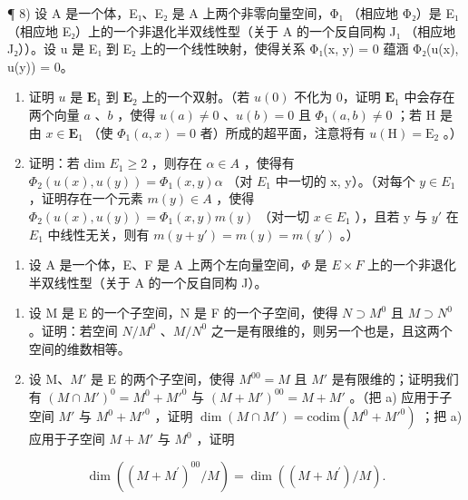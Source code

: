 ¶ 8) 设 A 是一个体，E₁、E₂ 是 A 上两个非零向量空间，Φ₁ （相应地 Φ₂）是 E₁ （相应地 E₂）上的一个非退化半双线性型（关于 A 的一个反自同构 J₁ （相应地 J₂））。设 u 是 E₁ 到 E₂ 上的一个线性映射，使得关系 Φ₁(x, y) = 0 蕴涵 Φ₂(u(x), u(y)) = 0。

\begin{enumerate}
\def\labelenumi{\alph{enumi})}
\item
  证明 \(u\) 是 \(\mathbf{E}_{1}\) 到 \(\mathbf{E}_{2}\) 上的一个双射。（若 \(u(0)\) 不化为 0，证明 \(\mathbf{E}_{1}\) 中会存在两个向量 \(a\) 、\(b\) ，使得 \(u(a) \neq 0\) 、\(u(b) = 0\) 且 \(\Phi_{1}(a, b) \neq 0\) ；若 H 是由 \(x \in \mathbf{E}_{1}\) （使 \(\Phi_{1}(a, x) = 0\) 者）所成的超平面，注意将有 \(u(\mathrm{H}) = \mathrm{E}_{2}\) 。）
\item
  证明：若 dim \(E_{1} \geqslant 2\) ，则存在 \(\alpha \in A\) ，使得有 \(\Phi_{2}(u(x), u(y)) = \Phi_{1}(x, y) \alpha\) （对 \(E_{1}\) 中一切的 x, y）。（对每个 \(y \in E_{1}\) ，证明存在一个元素 \(m(y) \in A\) ，使得 \(\Phi_{2}(u(x), u(y)) = \Phi_{1}(x, y)m(y)\) （对一切 \(x \in E_{1}\) ），且若 y 与 \(y'\) 在 \(E_{1}\) 中线性无关，则有 \(m(y + y') = m(y) = m(y')\) 。）
\end{enumerate}

\begin{enumerate}
\def\labelenumi{\arabic{enumi})}
\setcounter{enumi}{8}
\tightlist
\item
  设 A 是一个体，E、F 是 A 上两个左向量空间，\(\Phi\) 是 \(E \times F\) 上的一个非退化半双线性型（关于 A 的一个反自同构 J）。
\end{enumerate}

\begin{enumerate}
\def\labelenumi{\alph{enumi})}
\item
  设 M 是 E 的一个子空间，N 是 F 的一个子空间，使得 \(N \supset M^{0}\) 且 \(M \supset N^{0}\) 。证明：若空间 \(N/M^{0}\) 、\(M/N^{0}\) 之一是有限维的，则另一个也是，且这两个空间的维数相等。
\item
  设 M、\(M'\) 是 E 的两个子空间，使得 \(M^{00} = M\) 且 \(M'\) 是有限维的；证明我们有 \((M \cap M')^{0} = M^{0} + M'^{0}\) 与 \((M + M')^{00} = M + M'\) 。（把 a) 应用于子空间 \(M'\) 与 \(M^{0} + M'^{0}\) ，证明 \(\dim(M \cap M') = \text{codim}(M^{0} + M'^{0})\) ；把 a) 应用于子空间 \(M + M'\) 与 \(M^{0}\) ，证明
\end{enumerate}

\[
\dim ((M + M ^ {\prime}) ^ {0 0} / M) = \dim ((M + M ^ {\prime}) / M).
\]


